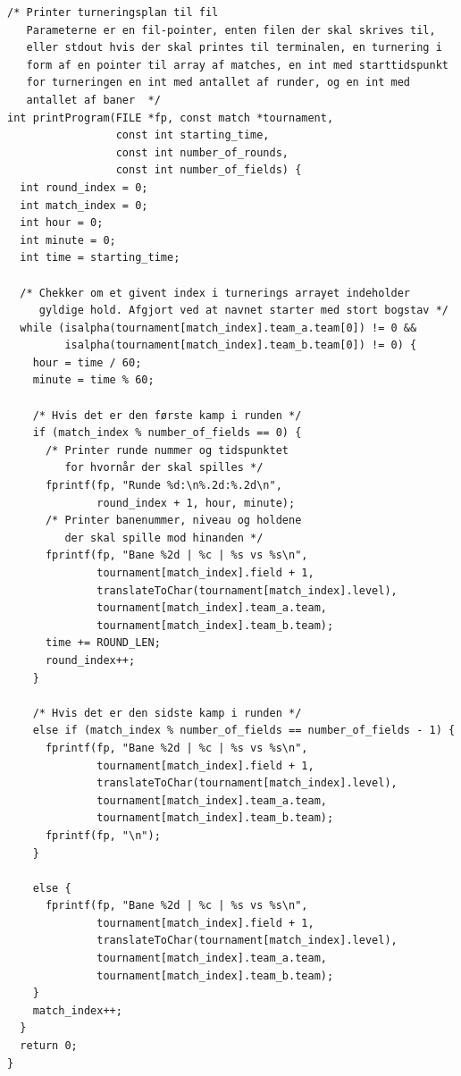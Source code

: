 \begin{listing}[H]
\begin{verbatim}
/* Printer turneringsplan til fil
   Parameterne er en fil-pointer, enten filen der skal skrives til, 
   eller stdout hvis der skal printes til terminalen, en turnering i 
   form af en pointer til array af matches, en int med starttidspunkt 
   for turneringen en int med antallet af runder, og en int med 
   antallet af baner  */
int printProgram(FILE *fp, const match *tournament, 
                 const int starting_time, 
                 const int number_of_rounds,
                 const int number_of_fields) {
  int round_index = 0;
  int match_index = 0;
  int hour = 0;
  int minute = 0;
  int time = starting_time;

  /* Chekker om et givent index i turnerings arrayet indeholder 
     gyldige hold. Afgjort ved at navnet starter med stort bogstav */
  while (isalpha(tournament[match_index].team_a.team[0]) != 0 &&
         isalpha(tournament[match_index].team_b.team[0]) != 0) {
    hour = time / 60;
    minute = time % 60;

    /* Hvis det er den første kamp i runden */
    if (match_index % number_of_fields == 0) {
      /* Printer runde nummer og tidspunktet 
         for hvornår der skal spilles */
      fprintf(fp, "Runde %d:\n%.2d:%.2d\n",
              round_index + 1, hour, minute);
      /* Printer banenummer, niveau og holdene
         der skal spille mod hinanden */
      fprintf(fp, "Bane %2d | %c | %s vs %s\n",
              tournament[match_index].field + 1, 
              translateToChar(tournament[match_index].level),
              tournament[match_index].team_a.team, 
              tournament[match_index].team_b.team);
      time += ROUND_LEN;
      round_index++;
    }

    /* Hvis det er den sidste kamp i runden */
    else if (match_index % number_of_fields == number_of_fields - 1) {
      fprintf(fp, "Bane %2d | %c | %s vs %s\n",
              tournament[match_index].field + 1,
              translateToChar(tournament[match_index].level),
              tournament[match_index].team_a.team, 
              tournament[match_index].team_b.team);
      fprintf(fp, "\n");
    }

    else {
      fprintf(fp, "Bane %2d | %c | %s vs %s\n",
              tournament[match_index].field + 1, 
              translateToChar(tournament[match_index].level),
              tournament[match_index].team_a.team,
              tournament[match_index].team_b.team);
    }
    match_index++;
  }
  return 0;
}
\end{verbatim}
\label{code:printProgram}
\end{listing}



